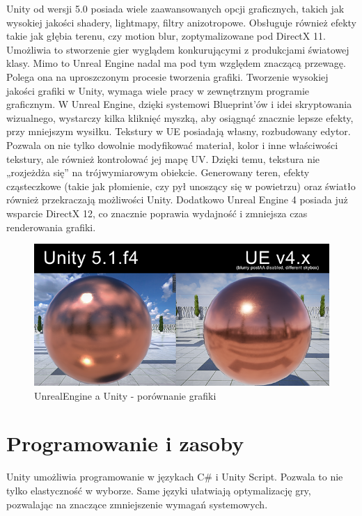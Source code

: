 \documentclass[12pt]{xmgr}
\begin{document}
Unity od wersji 5.0 posiada wiele zaawansowanych opcji graficznych, takich jak wysokiej jakości shadery, lightmapy, filtry anizotropowe. Obsługuje również efekty takie jak głębia terenu, czy motion blur, zoptymalizowane pod DirectX 11. Umożliwia to stworzenie gier wyglądem konkurującymi z produkcjami światowej klasy.
Mimo to Unreal Engine nadal ma pod tym względem znaczącą przewagę. Polega ona na uproszczonym procesie tworzenia grafiki. Tworzenie wysokiej jakości grafiki w Unity, wymaga wiele pracy w zewnętrznym programie graficznym. W Unreal Engine, dzięki systemowi Blueprint’ów i idei skryptowania wizualnego, wystarczy kilka kliknięć myszką, aby osiągnąć znacznie lepsze efekty, przy mniejszym wysiłku. Tekstury w UE posiadają własny, rozbudowany edytor. Pozwala on nie tylko dowolnie modyfikować materiał, kolor i inne właściwości  tekstury, ale również kontrolować jej mapę UV. Dzięki temu, tekstura nie „rozjeżdża się” na trójwymiarowym obiekcie. Generowany teren, efekty cząsteczkowe (takie jak płomienie, czy pył unoszący się w powietrzu) oraz światło również przekraczają możliwości Unity. Dodatkowo Unreal Engine 4 posiada już wsparcie DirectX 12, co znacznie poprawia wydajność i zmniejsza czas renderowania grafiki.

\begin{figure}[!htb]
    \begin{center}
    \includegraphics[scale=0.5]{Screeny/UE_vs_Unity}
    \end{center}
    \caption{UnrealEngine a Unity - porównanie grafiki}
\end{figure}

\section{Programowanie i zasoby}

Unity umożliwia programowanie w językach C\# i Unity Script. Pozwala to nie tylko elastyczność w wyborze. Same języki ułatwiają optymalizację gry, pozwalając na znaczące zmniejszenie wymagań systemowych.
\end{document}
